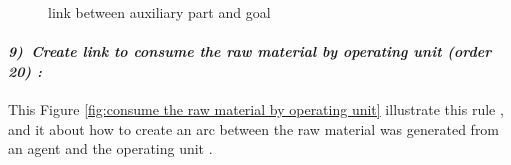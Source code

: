 \begin{figure}[th]
\caption{\label{fig:link between auxiliary part and goal}link between auxiliary part and goal}
 
\end{figure}
 
\paragraph{\emph{9)~Create link to consume the raw material by operating unit  (order 20) :} }
 
 
This Figure \ref{fig:consume the raw material by operating unit}  illustrate  this rule , and it about how to create an arc between 
the raw material was generated from an agent and the operating unit .

